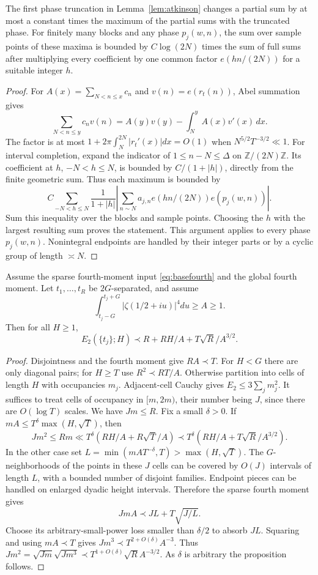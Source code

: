 \begin{lemma}\label{lem:completionproof}
The first phase truncation in Lemma~\ref{lem:atkinson} changes a partial
sum by at most a constant times the maximum of the partial sums with
the truncated phase. For finitely many blocks and any phase $p_j(w,n)$,
the sum over sample points of these maxima is bounded by
$C\log(2N)$ times the sum of full sums after multiplying every
coefficient by one common factor $e(hn/(2N))$ for a suitable integer $h$.
\end{lemma}
\begin{proof}
For $A(x)=\sum_{N<n\le x}c_n$ and $v(n)=e(r_t(n))$, Abel summation gives
\[
 \sum_{N<n\le y}c_nv(n)=A(y)v(y)-\int_N^y A(x)v'(x)\,dx.
\]
The factor is at most $1+2\pi\int_N^{2N}|r_t'(x)|dx=O(1)$ when
$N^{5/2}T^{-3/2}\ll1$.
For interval completion, expand the indicator of $1\le n-N\le\Delta$
on $\mathbb Z/(2N)\mathbb Z$. Its coefficient at $h$, $-N<h\le N$,
is bounded by $C/(1+|h|)$, directly from the finite geometric sum.
Thus each maximum is bounded by
\[
 C\sum_{-N<h\le N}\frac1{1+|h|}
 \left|\sum_{n\sim N}a_{j,n}e(hn/(2N))e(p_j(w,n))\right|.
\]
Sum this inequality over the blocks and sample points. Choosing the
$h$ with the largest resulting sum proves the statement.
This argument applies to every phase $p_j(w,n)$. Nonintegral endpoints are
handled by their integer parts or by a cyclic group of length $\asymp N$.
\end{proof}

\begin{proposition}
\label{prop:pairproof}
Assume the sparse fourth-moment input \eqref{eq:basefourth} and the
global fourth moment. Let $t_1,\ldots,t_R$ be $2G$-separated, and assume
\[
\int_{t_j-G}^{t_j+G}|\zeta(1/2+iu)|^4du\ge A\ge1.
\]
Then for all $H\ge1$,
\[
 E_2(\{t_j\};H)\prec R+RH/A+T\sqrt R/A^{3/2}.
\]
\end{proposition}
\begin{proof}
Disjointness and the fourth moment give $RA\prec T$.
For $H<G$ there are only diagonal pairs; for $H\ge T$ use
$R^2\prec RT/A$. Otherwise partition into cells of length $H$ with
occupancies $m_j$. Adjacent-cell Cauchy gives $E_2\le3\sum_jm_j^2$.
It suffices to treat cells of occupancy in $[m,2m)$, their number being
$J$, since there are $O(\log T)$ scales. We have $Jm\le R$.
Fix a small $\delta>0$.
If $mA\le T^\delta\max(H,\sqrt T)$, then
\[
 Jm^2\le Rm\ll T^\delta(RH/A+R\sqrt T/A)
 \prec T^\delta(RH/A+T\sqrt R/A^{3/2}).
\]
In the other case set $L=\min(mAT^{-\delta},T)>\max(H,\sqrt T)$.
The $G$-neighborhoods of the points in these $J$ cells can be covered
by $O(J)$ intervals of length $L$, with a bounded number of disjoint
families. Endpoint pieces can be handled on enlarged dyadic height
intervals. Therefore the sparse fourth moment gives
\[
 JmA\prec JL+T\sqrt{J/L}.
\]
Choose its arbitrary-small-power loss smaller than $\delta/2$ to
absorb $JL$. Squaring and using $mA\prec T$ gives
$Jm^3\prec T^{2+O(\delta)}A^{-3}$.
Thus $Jm^2=\sqrt{Jm}\sqrt{Jm^3}\prec
T^{1+O(\delta)}\sqrt R A^{-3/2}$.
As $\delta$ is arbitrary the proposition follows.
\end{proof}

